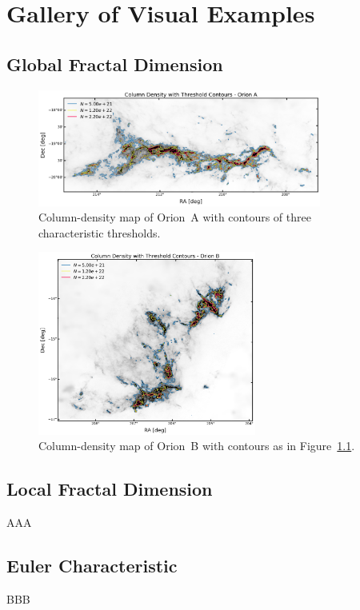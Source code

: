 \chapter{Gallery of Visual Examples}

\section{Global Fractal Dimension}

\begin{figure}[h]
    \centering
    \includegraphics[width=0.83\textwidth]{figures/Orion_A_gallery_global.png}
    \caption{Column-density map of Orion~A with contours of three characteristic thresholds.}
    \label{fig:gallery_global_thresholds_OA}
\end{figure}

\begin{figure}[h]
    \centering
    \includegraphics[width=0.64\textwidth]{figures/Orion_B_gallery_global.png}
    \caption{Column-density map of Orion~B with contours as in Figure~\ref{fig:gallery_global_thresholds_OA}.}
    \label{fig:gallery_global_thresholds_OB}
\end{figure}

\section{Local Fractal Dimension}

AAA

\section{Euler Characteristic}

BBB